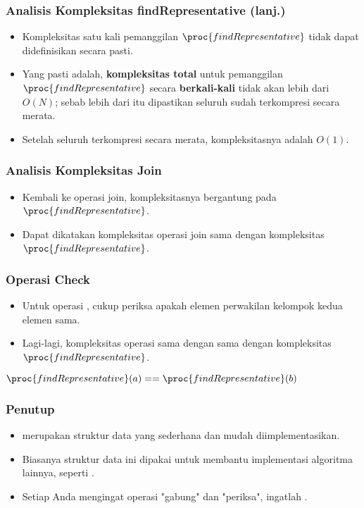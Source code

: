 \begin{frame}
\frametitle{Analisis Kompleksitas findRepresentative (lanj.)}
\begin{itemize}
  \item Kompleksitas satu kali pemanggilan $\proc{findRepresentative}$ tidak dapat didefinisikan secara pasti.
  \item Yang pasti adalah, \textbf{kompleksitas total} untuk pemanggilan $\proc{findRepresentative}$ secara \textbf{berkali-kali} tidak akan lebih dari $O(N)$; sebab lebih dari itu dipastikan seluruh  sudah terkompresi secara merata.
  \item Setelah seluruh  terkompresi secara merata, kompleksitasnya adalah $O(1)$.
\end{itemize}
\end{frame}

\begin{frame}
\frametitle{Analisis Kompleksitas Join}
\begin{itemize}
  \item Kembali ke operasi join, kompleksitasnya bergantung pada $\proc{findRepresentative}$.
  \item Dapat dikatakan kompleksitas operasi join sama dengan kompleksitas $\proc{findRepresentative}$.
\end{itemize}
\end{frame}

\begin{frame}
\frametitle{Operasi Check}
\begin{itemize}
  \item Untuk operasi , cukup periksa apakah elemen perwakilan kelompok kedua elemen sama.
  \item Lagi-lagi, kompleksitas operasi  sama dengan sama dengan kompleksitas $\proc{findRepresentative}$.
\end{itemize}
\begin{codebox}
\li   \Return $\proc{findRepresentative}(a) == \proc{findRepresentative}(b)$
\end{codebox}
\end{frame}

\begin{frame}
\frametitle{Penutup}
\begin{itemize}
  \item \pDjs merupakan struktur data yang sederhana dan mudah diimplementasikan.
  \item Biasanya struktur data ini dipakai untuk membantu implementasi algoritma lainnya, seperti .
  \item Setiap Anda mengingat operasi "gabung" dan "periksa", ingatlah \pdjs.
\end{itemize}
\end{frame}




